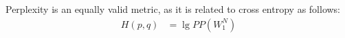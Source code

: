 \documentclass[10pt]{article}
\begin{document}
Perplexity is an equally valid metric, as it is related to cross entropy as follows:
\begin{align}
H(p,q) &= \lg PP(W_1^N) \label{relateCrossEntropyPerplexity} 
\end{align}


\end{document}
